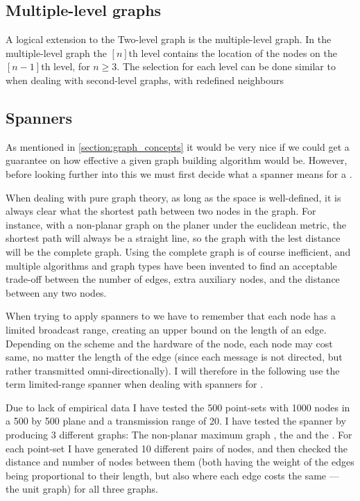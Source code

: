\subsection{Multiple-level graphs}
A logical extension to the Two-level graph is the multiple-level graph. In the multiple-level graph the $[n]$th level contains the location of the nodes on the $[n-1]$th level, for $n \geq 3$. The selection for each level can be done similar to when dealing with second-level graphs, with redefined neighbours    

\subsection{Spanners}
\label{section:spanners}
As mentioned in \ref{section:graph_concepts} it would be very nice if we could get a guarantee on how effective a given graph building algorithm would be. However, before looking further into this we must first decide what a spanner means for a \manet.

When dealing with pure graph theory, as long as the space is well-defined, it is always clear what the shortest path between two nodes in the graph. For instance, with a non-planar graph on the planer under the euclidean metric, the shortest path will always be a straight line, so the graph with the lest distance will be the complete graph. Using the complete graph is of course inefficient, and multiple algorithms and graph types have been invented to find an acceptable trade-off between the number of edges, extra auxiliary nodes, and the distance between any two nodes.

When trying to apply spanners to \manet we have to remember that each node has a limited broadcast range, creating an upper bound on the length of an edge. Depending on the scheme and the hardware of the node, each node may cost same, no matter the length of the edge (since each message is not directed, but rather transmitted omni-directionally). I will therefore in the following use the term limited-range spanner when dealing with spanners for \manet. 


Due to lack of empirical data I have tested the   500 point-sets with 1000 nodes in a 500 by 500 plane and a transmission range of 20. I have tested the spanner by producing 3 different graphs: The non-planar maximum graph , the \gabe and the \rng. For each point-set I have generated 10 different pairs of nodes, and then checked the distance and number of nodes between them (both having the weight of the edges being proportional to their length, but also where each edge costs the same --- the unit graph) for all three graphs. 

